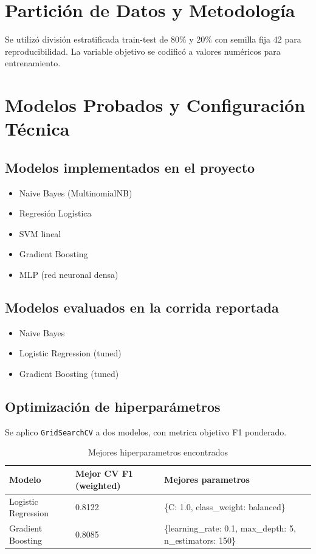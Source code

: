 ﻿\documentclass[12pt,a4paper]{article}
\begin{document}
\section{Partición de Datos y Metodología}
Se utilizó división estratificada train-test de 80\% y 20\% con semilla fija 42 para reproducibilidad.
La variable objetivo se codificó a valores numéricos para entrenamiento.

\section{Modelos Probados y Configuración Técnica}
\subsection{Modelos implementados en el proyecto}
\begin{itemize}
  \item Naive Bayes (MultinomialNB)
  \item Regresión Logística
  \item SVM lineal
  \item Gradient Boosting
  \item MLP (red neuronal densa)
\end{itemize}

\subsection{Modelos evaluados en la corrida reportada}
\begin{itemize}
  \item Naive Bayes
  \item Logistic Regression (tuned)
  \item Gradient Boosting (tuned)
\end{itemize}

\subsection{Optimización de hiperparámetros}
Se aplico \texttt{GridSearchCV} a dos modelos, con metrica objetivo F1 ponderado.

\begin{table}[H]
\centering
\caption{Mejores hiperparametros encontrados}
\begin{tabular}{p{4.2cm} p{3.0cm} p{7.0cm}}
\toprule
Modelo & Mejor CV F1 (weighted) & Mejores parametros \\
\midrule
Logistic Regression & 0.8122 & \{C: 1.0, class\_weight: balanced\} \\
Gradient Boosting & 0.8085 & \{learning\_rate: 0.1, max\_depth: 5, n\_estimators: 150\} \\
\bottomrule
\end{tabular}
\end{table}
\end{document}
